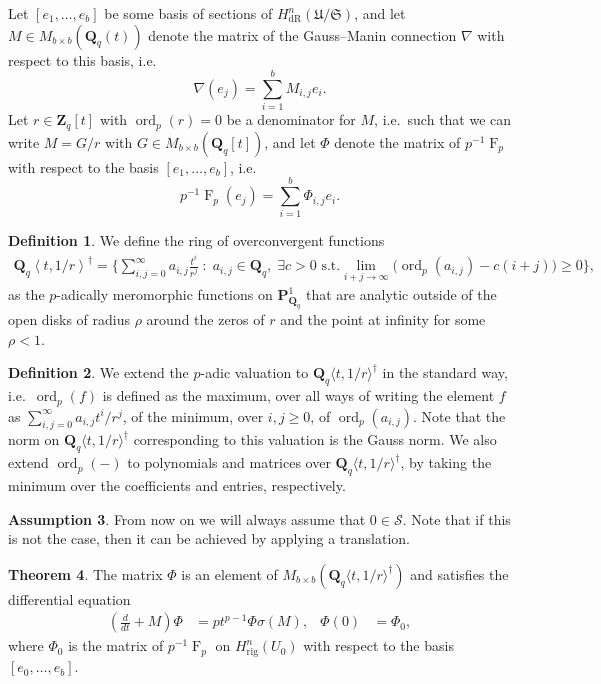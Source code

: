 \documentclass[a4paper,11pt]{article}
\numberwithin{equation}{section}
\newcommand{\ZZ}{\mathbf{Z}} %
\newcommand{\QQ}{\mathbf{Q}} %
\DeclareMathOperator{\ord}{ord}          %
\DeclareMathOperator{\Frob}{F}           %
\providecommand{\HdR}{H_{\text{dR}}}    %
\providecommand{\Hrig}{H_{\text{rig}}}  %
\theoremstyle{definition}
\newtheorem{thm}{Theorem}[section]
\newtheorem{defn}[thm]{Definition}
\newtheorem{assump}[thm]{Assumption}
\begin{document}
Let $[e_1, \dotsc, e_b]$ be some basis of sections of 
$\HdR^n(\mathfrak{U}/\mathfrak{S})$, and let $M \in M_{b \times b}(\QQ_q(t))$ 
denote the matrix of the Gauss--Manin connection $\nabla$ with respect 
to this basis, i.e.
\[
\nabla (e_j) = \sum_{i=1}^b M_{i,j} e_i.
\]
Let $r \in \ZZ_q[t]$ with $\ord_p(r)=0$ be a denominator for $M$, i.e.\ such that we can write 
$M = G/r$ with $G \in M_{b \times b}(\QQ_q[t])$, and let $\Phi$ denote the 
matrix of $p^{-1}\Frob_p$ with respect to the basis $[e_1, \dotsc, e_b]$, i.e.\
\[
p^{-1} \Frob_p (e_j) = \sum_{i=1}^b \Phi_{i,j} e_i.
\]

\begin{defn}
We define the ring of overconvergent functions
\begin{align*}
\QQ_q \left\langle t, 1/r \right\rangle^{\dag} = 
\Biggl\{\sum_{i,j=0}^{\infty} a_{i,j} \frac{t^i}{r^j} \; : \; 
a_{i,j} \in \QQ_q, \; \exists c > 0 \text{ s.t.}  
\lim_{i+j \rightarrow \infty} \bigl(\ord_p(a_{i,j}) - c(i+j)\bigr) \geq 0
\Biggr\},
\end{align*}
as the $p$-adically meromorphic functions on $\mathbf{P}^1_{\QQ_q}$ that are 
analytic outside of the open disks of radius $\rho$ around the zeros of $r$ 
and the point at infinity for some $\rho<1$. 
\end{defn}

\begin{defn}
We extend the $p$-adic valuation 
to $\QQ_q \langle t, 1/r \rangle^{\dag}$ in the standard way, i.e.\ 
$\ord_p(f)$ is defined as the maximum, over all ways of writing the element $f$ as
$\sum_{i,j=0}^{\infty} a_{i,j} t^i / r^j$,
of the minimum, over $i,j \geq 0$, of $\ord_p(a_{i,j})$. Note that the  
norm on $\QQ_q \langle t, 1/r \rangle^{\dag}$ corresponding to this valuation
is the Gauss norm. We also extend $\ord_p(-)$ to polynomials and matrices over 
$\QQ_q \langle t, 1/r \rangle^{\dag}$, by taking the 
minimum over the coefficients and entries, respectively.
\end{defn}

\begin{assump} \label{assump:S}
From now on we will always assume that $0 \in \mathcal{S}$. 
Note that if this is not the case, then it can be achieved by 
applying a translation.
\end{assump}

\begin{thm} \label{thm:eqphi} 
The matrix $\Phi$ is an element of 
$M_{b \times b}(\QQ_q \langle t, 1/r \rangle^{\dag})$ 
and satisfies the differential equation
\begin{align*}
\left(\frac{d}{dt} + M\right) \Phi &= p t^{p-1} \Phi \sigma(M), &\Phi(0)& = \Phi_0,
\end{align*}
where $\Phi_0$ is the 
matrix of $p^{-1}\Frob_p$ on $\Hrig^n(U_0)$ with respect to the 
basis $[e_0,\dotsc,e_b]$.
\end{thm}
\end{document}

